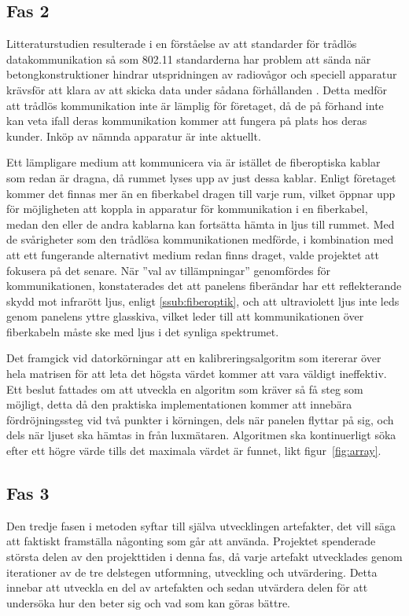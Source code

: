     \subsection{Fas 2} %
    \label{sub:steg_2}
        Litteraturstudien resulterade i en förståelse av att standarder för trådlös datakommunikation så som 802.11 standarderna har problem att sända när betongkonstruktioner hindrar utspridningen av radiovågor och speciell apparatur krävsför att klara av att skicka data under sådana förhållanden \cite{11n}. Detta medför att trådlös kommunikation inte är lämplig för företaget, då de på förhand inte kan veta ifall deras kommunikation kommer att fungera på plats hos deras kunder. Inköp av nämnda apparatur är inte aktuellt. \bigskip

        Ett lämpligare medium att kommunicera via är istället de fiberoptiska kablar som redan är dragna, då rummet lyses upp av just dessa kablar. Enligt företaget kommer det finnas mer än en fiberkabel dragen till varje rum, vilket öppnar upp för möjligheten att koppla in apparatur för kommunikation i en fiberkabel, medan den eller de andra kablarna kan fortsätta hämta in ljus till rummet. Med de svårigheter som den trådlösa kommunikationen medförde, i kombination med att ett fungerande alternativt medium redan finns draget, valde projektet att fokusera på det senare. När ''val av tillämpningar'' genomfördes för kommunikationen, konstaterades det att panelens fiberändar har ett reflekterande skydd mot infrarött ljus, enligt \ref{ssub:fiberoptik}, och att ultraviolett ljus inte leds genom panelens yttre glasskiva, vilket leder till att kommunikationen över fiberkabeln måste ske med ljus i det synliga spektrumet. \bigskip

        Det framgick vid datorkörningar att en kalibreringsalgoritm som itererar över hela matrisen för att leta det högsta värdet kommer att vara väldigt ineffektiv. Ett beslut fattades om att utveckla en algoritm som kräver så få steg som möjligt, detta då den praktiska implementationen kommer att innebära fördröjningssteg vid två punkter i körningen, dels när panelen flyttar på sig, och dels när ljuset ska hämtas in från luxmätaren. Algoritmen ska kontinuerligt söka efter ett högre värde tills det maximala värdet är funnet, likt figur~\ref{fig:array}.


    \subsection{Fas 3} %
    \label{sub:steg_3}
        Den tredje fasen i metoden syftar till själva utvecklingen artefakter, det vill säga att faktiskt framställa någonting som går att använda. Projektet spenderade största delen av den projekttiden i denna fas, då varje artefakt utvecklades genom iterationer av de tre delstegen utformning, utveckling och utvärdering. Detta innebar att utveckla en del av artefakten och sedan utvärdera delen för att undersöka hur den beter sig och vad som kan göras bättre.

